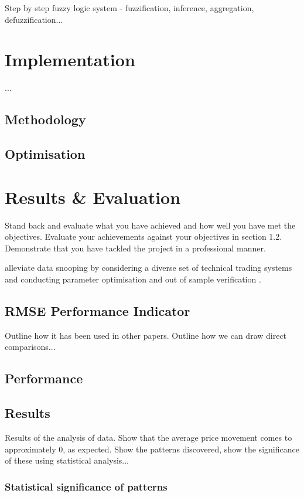 \documentclass{article}
\theoremstyle{definition}
\begin{document}
Step by step fuzzy logic system - fuzzification, inference, aggregation, defuzzification...

\section{Implementation}

...

\subsection{Methodology}

\subsection{Optimisation}

\section{Results \& Evaluation}
Stand back and evaluate what you have achieved and how well you have met the objectives. Evaluate your achievements against your objectives in section 1.2. Demonstrate that you have tackled the project in a professional manner. 

alleviate data snooping by considering a diverse set of technical trading systems and conducting parameter optimisation and out of sample verification \citep{taprofitability}.

\subsection{RMSE Performance Indicator}

Outline how it has been used in other papers. Outline how we can draw direct comparisons...

\subsection{Performance}

\subsection{Results}

Results of the analysis of data. Show that the average price movement comes to approximately 0, as expected. Show the patterns discovered, show the significance of these using statistical analysis...

\subsubsection{Statistical significance of patterns}
\end{document}
